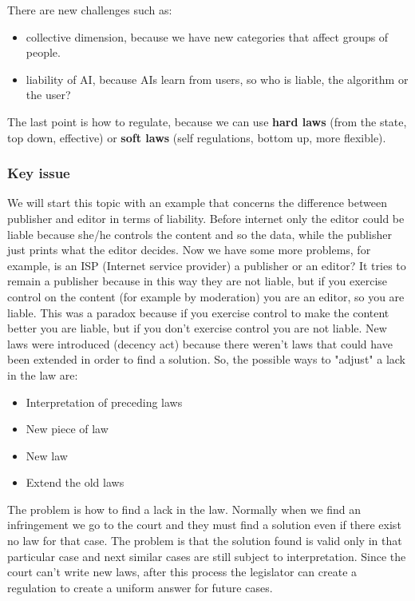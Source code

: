 There are new challenges such as:
\begin{itemize}
    \item collective dimension, because we have new categories that affect groups of people.
    \item liability of AI, because AIs learn from users, so who is liable, the algorithm or the user?
\end{itemize}

The last point is how to regulate, because we can use \textbf{hard laws} (from the state, top down, effective) or \textbf{soft laws} (self regulations, bottom up, more flexible).

\subsubsection{Key issue}
We will start this topic with an example that concerns the difference between publisher and editor in terms of liability. Before internet only the editor could be liable because she/he controls the content and so the data, while the publisher just prints what the editor decides. Now we have some more problems, for example, is an ISP (Internet service provider) a publisher or an editor? It tries to remain a publisher because in this way they are not liable, but if you exercise control on the content (for example by moderation) you are an editor, so you are liable. This was a paradox because if you exercise control to make the content better you are liable, but if you don't exercise control you are not liable. New laws were introduced (decency act) because there weren't laws that could have been extended in order to find a solution. So, the possible ways to "adjust" a lack in the law are:
\begin{itemize}
    \item Interpretation of preceding laws
    \item New piece of law
    \item New law
    \item Extend the old laws
\end{itemize}
The problem is how to find a lack in the law. Normally when we find an infringement we go to the court and they must find a solution even if there exist no law for that case. The problem is that the solution found is valid only in that particular case and next similar cases are still subject to interpretation. Since the court can't write new laws, after this process the legislator can create a regulation to create a uniform answer for future cases.

